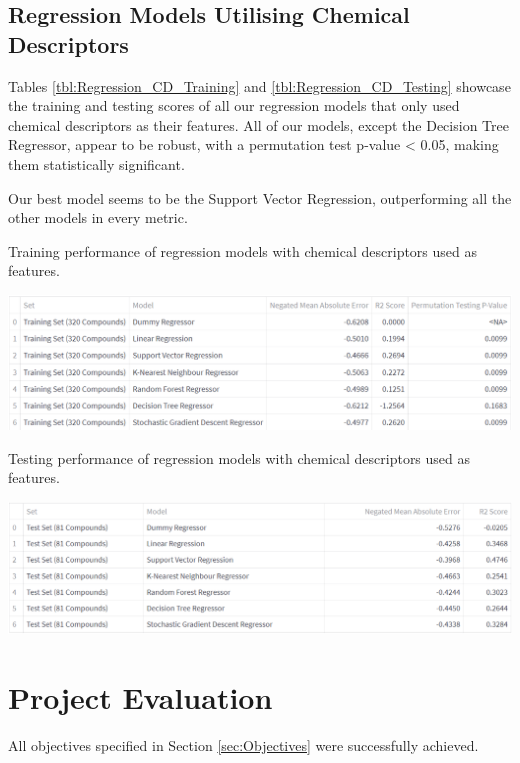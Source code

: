\subsection{Regression Models Utilising Chemical Descriptors}

Tables \ref{tbl:Regression_CD_Training} and \ref{tbl:Regression_CD_Testing} showcase the training and testing scores of all our regression models that only used chemical descriptors as their features. All of our models, except the Decision Tree Regressor, appear to be robust, with a permutation test p-value < 0.05, making them statistically significant. 

Our best model seems to be the Support Vector Regression, outperforming all the other models in every metric.

\begin{table}[!ht]
  \caption{Training performance of regression models with chemical descriptors used as features.}
  \label{tbl:Regression_CD_Training}
  \includegraphics[width=1.0\linewidth]{images/Regression CD Training.pdf}
\end{table}

\begin{table}[!ht]
  \caption{Testing performance of regression models with chemical descriptors used as features.}
  \label{tbl:Regression_CD_Testing}
  \includegraphics[width=1.0\linewidth]{images/Regression CD Testing.pdf}
\end{table}

\section{Project Evaluation}

All objectives specified in Section \ref{sec:Objectives} were successfully achieved. 


